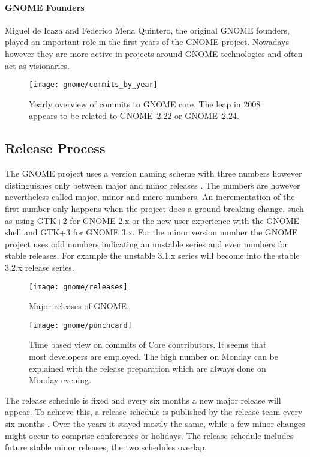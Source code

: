\paragraph{GNOME Founders}

Miguel de Icaza and Federico Mena Quintero, the original GNOME founders, played
an important role in the first years of the GNOME project. Nowadays however
they are more active in projects around GNOME technologies and often act as
visionaries.

\begin{figure}[htbp]
  \centering
  \texttt{[image: gnome/commits\_by\_year]}
  \caption{Yearly overview of commits to GNOME core. The leap in 2008 appears
  to be related to GNOME~2.22 or GNOME~2.24.}
\end{figure}


\subsection{Release Process} %

The GNOME project uses a version naming scheme with three numbers however
distinguishes only between major and minor releases
\cite{GNOMEDevelopmentSchedule,GNOMESchedule}. The numbers are however
nevertheless called major, minor and micro numbers. An incrementation of the
first number only happens when the project does a ground-breaking change, such
as using GTK+2 for GNOME 2.x or the new user experience with the GNOME shell
and GTK+3 for GNOME 3.x. For the minor version number the GNOME project uses
odd numbers indicating an unstable series and even numbers for stable releases.
For example the unstable 3.1.x series will become into the stable 3.2.x release
series.

\begin{figure}[htbp]
  \centering
  \texttt{[image: gnome/releases]}
  \caption{Major releases of GNOME.}
\end{figure}

\begin{figure}[htbp]
  \centering
  \texttt{[image: gnome/punchcard]}
  \caption{Time based view on commits of Core contributors. It seems that most
  developers are employed. The high number on Monday can be explained with the
  release preparation which are always done on Monday evening.}
\end{figure}

The release schedule is fixed and every six months a new major release will
appear. To achieve this, a release schedule is published by the release team
every six months \cite{GNOMEDevelopmentSchedule}. Over the years it stayed
mostly the same, while a few minor changes might occur to comprise conferences
or holidays. The release schedule includes future stable minor releases, the
two schedules overlap.

